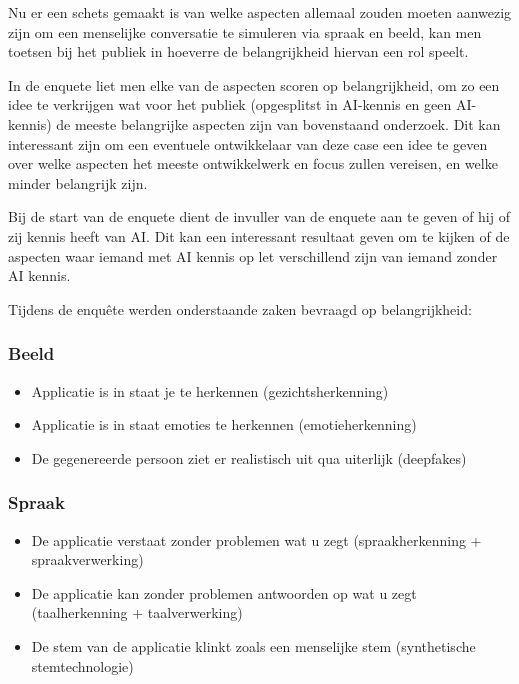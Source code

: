 Nu er een schets gemaakt is van welke aspecten allemaal zouden moeten aanwezig zijn om een menselijke conversatie te simuleren via spraak en beeld, kan men toetsen bij het publiek in hoeverre de belangrijkheid hiervan een rol speelt.

In de enquete liet men elke van de aspecten scoren op belangrijkheid, om zo een idee te verkrijgen wat voor het publiek (opgesplitst in AI-kennis en geen AI-kennis) de meeste belangrijke aspecten zijn van bovenstaand onderzoek. Dit kan interessant zijn om een eventuele ontwikkelaar van deze case een idee te geven over welke aspecten het meeste ontwikkelwerk en focus zullen vereisen, en welke minder belangrijk zijn.

Bij de start van de enquete dient de invuller van de enquete aan te geven of hij of zij kennis heeft van AI. Dit kan een interessant resultaat geven om te kijken of de aspecten waar iemand met AI kennis op let verschillend zijn van iemand zonder AI kennis.

Tijdens de enquête werden onderstaande zaken bevraagd op belangrijkheid:

\subsubsection{Beeld}

\begin{itemize}
    \item Applicatie is in staat je te herkennen (gezichtsherkenning)
    \item Applicatie is in staat emoties te herkennen (emotieherkenning)
    \item De gegenereerde persoon ziet er realistisch uit qua uiterlijk (deepfakes)
\end{itemize}

\subsubsection{Spraak}

\begin{itemize}
    \item De applicatie verstaat zonder problemen wat u zegt (spraakherkenning + spraakverwerking)
    \item De applicatie kan zonder problemen antwoorden op wat u zegt (taalherkenning + taalverwerking)
    \item De stem van de applicatie klinkt zoals een menselijke stem (synthetische stemtechnologie)
\end{itemize}

